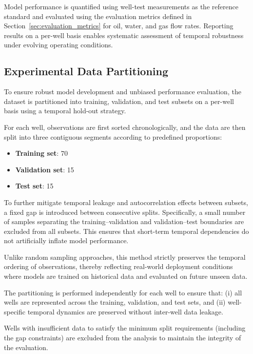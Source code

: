 \documentclass[12pt,APA]{uomthesis}
\begin{document}
Model performance is quantified using well-test measurements as the reference standard and evaluated using the evaluation metrics defined in Section~\ref{sec:evaluation_metrics} for oil, water, and gas flow rates. 
Reporting results on a per-well basis enables systematic assessment of temporal robustness under evolving operating conditions.

\subsection{Experimental Data Partitioning}
To ensure robust model development and unbiased performance evaluation, the dataset is partitioned into training, validation, and test subsets on a per-well basis using a temporal hold-out strategy.

For each well, observations are first sorted chronologically, and the data are then split into three contiguous segments according to predefined proportions:

\begin{itemize}
\item \textbf{Training set}: 70%
\item \textbf{Validation set}: 15%
\item \textbf{Test set}: 15%
\end{itemize}

To further mitigate temporal leakage and autocorrelation effects between subsets, a fixed gap is introduced between consecutive splits. Specifically, a small number of samples separating the training–validation and validation–test boundaries are excluded from all subsets. This ensures that short-term temporal dependencies do not artificially inflate model performance.

Unlike random sampling approaches, this method strictly preserves the temporal ordering of observations, thereby reflecting real-world deployment conditions where models are trained on historical data and evaluated on future unseen data.

The partitioning is performed independently for each well to ensure that:
(i) all wells are represented across the training, validation, and test sets, and
(ii) well-specific temporal dynamics are preserved without inter-well data leakage.

Wells with insufficient data to satisfy the minimum split requirements (including the gap constraints) are excluded from the analysis to maintain the integrity of the evaluation.
\end{document}
